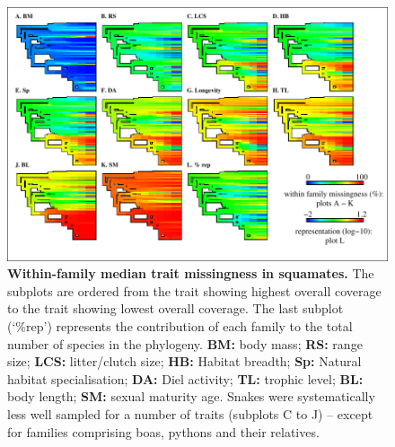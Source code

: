 \clearpage
\begin{figure}[]
\centering
\includegraphics[scale=1.1]{figures/chapter2/NA_phylo_patterns/Reptiles_coverage}
\caption[Within-family median trait missingness in squamates]{\textbf{Within-family median trait missingness in squamates.} The subplots are ordered from the trait showing highest overall coverage to the trait showing lowest overall coverage. The last subplot (`\%rep') represents the contribution of each family to the total number of species in the phylogeny. \textbf{BM:} body mass; \textbf{RS:} range size; \textbf{LCS:} litter/clutch size; \textbf{HB:} Habitat breadth; \textbf{Sp:} Natural habitat specialisation; \textbf{DA:} Diel activity; \textbf{TL:} trophic level; \textbf{BL:} body length; \textbf{SM:} sexual maturity age. Snakes were systematically less well sampled for a number of traits (subplots C to J) -- except for families comprising boas, pythons and their relatives.}
\label{familycov_reptiles}
\end{figure}


